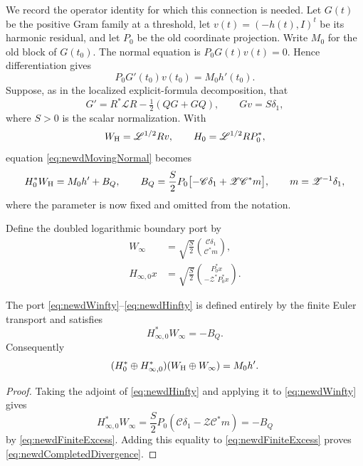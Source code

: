 We record the operator identity for which this connection is needed.  Let
$G(t)$ be the positive Gram family at a threshold, let
$v(t)=(-h(t),I)^t$ be its harmonic residual, and let $P_0$ be the old
coordinate projection.  Write $M_0$ for the old block of $G(t_0)$.  The
normal equation is $P_0G(t)v(t)=0$.  Hence differentiation gives
\begin{equation}\label{eq:newdMovingNormal}
 P_0G'(t_0)v(t_0)=M_0h'(t_0).
\end{equation}
Suppose, as in the localized explicit-formula decomposition, that
\[
 G'=R^*\mathscr LR-\tfrac12(QG+GQ),
 \qquad Gv=S\delta_1,
\]
where $S>0$ is the scalar normalization.  With
\[
 W_{\rm H}=\mathscr L^{1/2}Rv,
 \qquad H_0=\mathscr L^{1/2}RP_0^*,
\]
equation \eqref{eq:newdMovingNormal} becomes
\begin{equation}\label{eq:newdFiniteExcess}
 H_0^*W_{\rm H}=M_0h'+B_Q,
 \qquad
 B_Q=\frac S2P_0
 \bigl[-\mathscr C\delta_1+\mathscr Z\mathscr C^*m\bigr],
 \qquad m=\mathscr Z^{-1}\delta_1,
\end{equation}
where the parameter is now fixed and omitted from the notation.

Define the doubled logarithmic boundary port by
\begin{align}
 W_\infty
 &=\sqrt{\frac S2}
   \binom{\mathscr C\delta_1}{\mathscr C^*m},
   \label{eq:newdWinfty}\\
 H_{\infty,0}x
 &=\sqrt{\frac S2}
   \binom{P_0^*x}{-\mathscr Z^*P_0^*x}.
   \label{eq:newdHinfty}
\end{align}

\begin{theorem}
\label{thm:newdAmplitude}
The port \eqref{eq:newdWinfty}--\eqref{eq:newdHinfty} is defined entirely
by the finite Euler transport and satisfies
\begin{equation}\label{eq:newdAmplitude}
 H_{\infty,0}^*W_\infty=-B_Q.
\end{equation}
Consequently
\begin{equation}\label{eq:newdCompletedDivergence}
 (H_0^*\oplus H_{\infty,0}^*)
 (W_{\rm H}\oplus W_\infty)=M_0h'.
\end{equation}
\end{theorem}

\begin{proof}
Taking the adjoint of \eqref{eq:newdHinfty} and applying it to
\eqref{eq:newdWinfty} gives
\[
 H_{\infty,0}^*W_\infty
 =\frac S2P_0
   (\mathscr C\delta_1-\mathscr Z\mathscr C^*m)
 =-B_Q
\]
by \eqref{eq:newdFiniteExcess}.  Adding this equality to
\eqref{eq:newdFiniteExcess} proves
\eqref{eq:newdCompletedDivergence}.
\end{proof}

